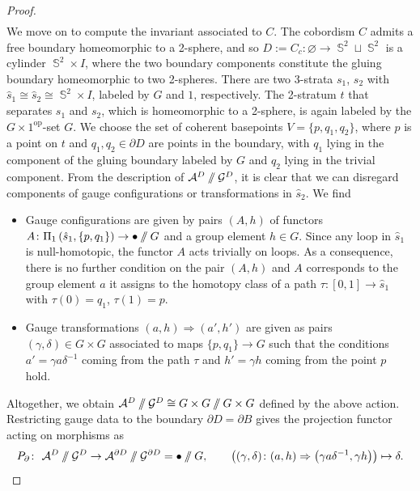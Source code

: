 \documentclass[pdftex]{sigma}
\DeclareMathOperator{\Sp}{\mathbb{S}}
\newcommand{\sslash}{\mathbin{/\mkern-6mu/}}
\numberwithin{equation}{section}
\theoremstyle{definition}
\begin{document}
\begin{proof}
\begin{align*}
 \end{align*}
 We move on to compute the invariant associated to $C$. The cobordism $C$ admits a free boundary homeomorphic to a 2-sphere, and so $D := C_c\colon \varnothing \rightarrow \Sp^2 \sqcup \Sp^2$ is a cylinder $\Sp^2 \times I$, where the two boundary components constitute the gluing boundary homeomorphic to two 2-spheres. There are two 3-strata $s_1$, $s_2$ with $\hat{s}_1 \cong \hat{s}_2 \cong \Sp^2 \times I$, labeled by $G$ and $1$, respectively. The 2-stratum $t$ that separates $s_1$ and $s_2$, which is homeomorphic to a 2-sphere, is again labeled by the $G \times 1^{\mathrm{op}}$-set $G$. We choose the set of coherent basepoints $V = \{p,q_1, q_2\}$, where $p$ is a point on $t$ and $q_1, q_2 \in \partial D$ are points in the boundary, with $q_1$ lying in the component of the gluing boundary labeled by $G$ and $q_2$ lying in the trivial component. From the description of $\mathcal{A}^{D} \sslash \mathcal{G}^{D}$, it is clear that we can disregard components of gauge configurations or transformations in $\hat{s}_2$. We find
 \begin{itemize}\itemsep=0pt
 \item Gauge configurations are given by pairs $(A, h)$ of functors $A\colon \Pi_1\left(\hat{s}_1, \{p,q_1\}\right) \rightarrow \bullet \sslash G$ and a group element $h \in G$. Since any loop in $\hat{s}_1$ is null-homotopic, the functor $A$ acts trivially on loops. As a consequence, there is no further condition on the pair $(A,h)$ and $A$ corresponds to the group element $a$ it assigns to the homotopy class of a path $\tau\colon [0,1] \rightarrow \hat{s}_1$ with $\tau(0) = q_1$, $\tau(1) = p$.
 \item Gauge transformations $(a, h) \Rightarrow (a', h')$ are given as pairs $(\gamma, \delta) \in G \times G$ associated to maps $\{p, q_1\} \rightarrow G$ such that the conditions $a' = \gamma a \delta^{-1}$ coming from the path $\tau$ and $h' = \gamma h$ coming from the point $p$ hold.
 \end{itemize}
 Altogether, we obtain $\mathcal{A}^{ D} \sslash \mathcal{G}^{ D} \cong G \times G \sslash G \times G$ defined by the above action. Restricting gauge data to the boundary $\partial D = \partial B$ gives the projection functor acting on morphisms as
 \begin{align*}
 P_{\partial}\colon \ \mathcal{A}^{ D} \sslash \mathcal{G}^{ D} \rightarrow \mathcal{A}^{ \partial D} \sslash \mathcal{G}^{\partial D} = \bullet \sslash G, \qquad \bigl((\gamma, \delta)\colon (a, h) \Rightarrow \bigl(\gamma a\delta^{-1}, \gamma h\bigr)\bigr) \mapsto \delta.

\end{align*}
\end{proof}
\end{document}
